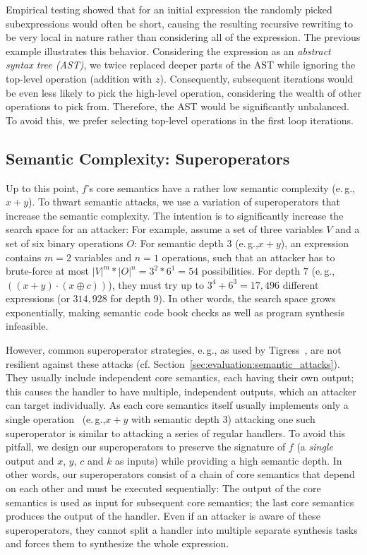 \documentclass[letterpaper,twocolumn,10pt]{article}
\newcommand{\eg}{e.\,g.,\xspace}
\newcommand{\cf}{cf.\xspace}
\theoremstyle{customexample}
\theoremstyle{customexperiment}
\begin{document}
Empirical testing showed 
that for an initial expression the randomly picked subexpressions would often be short, causing the resulting recursive rewriting to be very local in nature rather than considering all of the expression. The previous example illustrates this behavior. Considering the expression as an \emph{abstract syntax tree (AST)}, we twice replaced deeper parts of the AST while ignoring the top-level operation (addition with $z$). Consequently, subsequent iterations would be even less likely to pick the high-level operation, considering the wealth of other operations to pick from. Therefore, the AST would be significantly unbalanced. To avoid this, we prefer selecting top-level operations in the first loop iterations.






\subsection{Semantic Complexity: Superoperators}\label{sec:design:superoperators}
Up to this point, $f$'s core semantics have a rather low semantic complexity (\eg $x + y$). To thwart semantic attacks, we use a variation of superoperators that increase the semantic complexity. 
The intention is to significantly increase the search space for an attacker:
For example, assume a set of three variables $V$ and a set of six binary operations $O$: For semantic depth 3 (\eg $x + y$), an expression contains $m = 2$ variables and $n = 1$ operations, such that an attacker has to brute-force at most $|V|^{m} * |O|^{n} = 3^2 * 6^1 = 54$ possibilities. For depth $7$ (\eg $((x + y) \cdot (x \oplus c))$), they must try up to $3^4 +  6^3 = 17,496$ different expressions (or $314,928$ for depth 9).
In other words, the search space grows exponentially, making semantic code book checks as well as program synthesis infeasible.

However, common superoperator strategies, \eg as used by Tigress~\cite{tigress}, are not resilient against these attacks (\cf Section~\ref{sec:evaluation:semantic_attacks}).
They usually include independent core semantics, each having their own output; this causes the handler to have multiple, independent outputs, which an attacker can target individually.
As each core semantics itself usually implements only a single operation~\cite{rolles2009unpacking,blazytko2017syntia} (\eg $x + y$ with semantic depth 3) attacking one such superoperator is similar to attacking a series of regular handlers.
To avoid this pitfall, we design our superoperators to preserve the signature of $f$ (a \emph{single} output and $x$, $y$, $c$ and $k$ as inputs) while providing a high semantic depth. 
In other words, our superoperators consist of a chain of core semantics that depend on each other and must be executed sequentially: The output of the core semantics is used as input for subsequent core semantics; the last core semantics produces the output of the handler.
Even if an attacker is aware of these superoperators, they cannot split a handler into multiple separate synthesis tasks and forces them to synthesize the whole expression.
\end{document}

